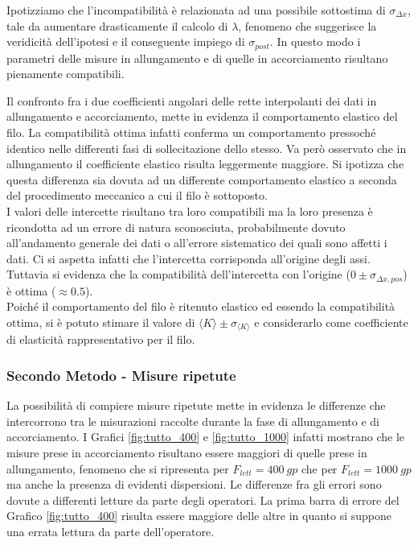 \documentclass[a4paper,11pt,oneside]{article}
\begin{document}
Ipotizziamo che l'incompatibilità è relazionata ad una possibile sottostima di $\sigma_{\Delta x}$, tale da aumentare drasticamente il calcolo di $\lambda$, fenomeno che suggerisce la veridicità dell'ipotesi e il conseguente impiego di $\sigma_{post}$. In questo modo i parametri delle misure in allungamento e di quelle in accorciamento risultano pienamente compatibili.

Il confronto fra i due coefficienti angolari delle rette interpolanti dei dati in allungamento e accorciamento, mette in evidenza il comportamento elastico del filo. La compatibilità ottima infatti conferma un comportamento pressoché identico nelle differenti fasi di sollecitazione dello stesso. Va però osservato che in allungamento il coefficiente elastico risulta leggermente maggiore. Si ipotizza che questa differenza sia dovuta ad un differente comportamento elastico a seconda del procedimento meccanico a cui il filo è sottoposto.\\

I valori delle intercette risultano tra loro compatibili ma la loro presenza è ricondotta ad un errore di natura sconosciuta, probabilmente dovuto all'andamento generale dei dati o all'errore sistematico dei quali sono affetti i dati. Ci si aspetta infatti che l'intercetta corrisponda all'origine degli assi. Tuttavia si evidenza che la compatibilità dell'intercetta con l'origine ($0\pm \sigma_{\Delta x, pos}$) è ottima ($\approx \num{0.5}$).\\

Poiché il comportamento del filo è ritenuto elastico ed essendo la compatibilità ottima, si è potuto stimare il valore di $\langle K \rangle \pm \sigma_{\langle K \rangle}$ e considerarlo come coefficiente di elasticità rappresentativo per il filo.\\

\subsubsection*{Secondo Metodo - Misure ripetute}
\begin{figure}[h!]
    \centering
\end{figure}

La possibilità di compiere misure ripetute mette in evidenza le differenze che intercorrono tra le misurazioni raccolte durante la fase di allungamento e di accorciamento. I Grafici \ref{fig:tutto_400} e \ref{fig:tutto_1000} infatti mostrano che le misure prese in accorciamento risultano essere maggiori di quelle prese in allungamento, fenomeno che si ripresenta per $F_{lett}=\SI{400}{gp}$ che per $F_{lett}=\SI{1000}{gp}$ ma anche la presenza di evidenti dispersioni. Le differenze fra gli errori sono dovute a differenti letture da parte degli operatori. La prima barra di errore del Grafico \ref{fig:tutto_400} risulta essere maggiore delle altre in quanto si suppone una errata lettura da parte dell'operatore.
\end{document}
